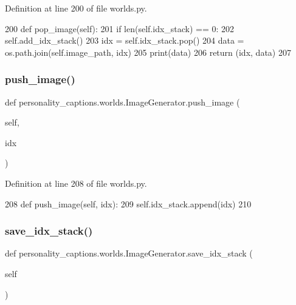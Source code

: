 Definition at line 200 of file worlds.\+py.


\begin{DoxyCode}
200     \textcolor{keyword}{def }pop\_image(self):
201         \textcolor{keywordflow}{if} len(self.idx\_stack) == 0:
202             self.add\_idx\_stack()
203         idx = self.idx\_stack.pop()
204         data = os.path.join(self.image\_path, idx)
205         print(data)
206         \textcolor{keywordflow}{return} (idx, data)
207 
\end{DoxyCode}
\mbox{\label{classpersonality__captions_1_1worlds_1_1ImageGenerator_a78705bbcfdb530dc94ff25cc0aa7fd65}} 
\subsubsection{\texorpdfstring{push\+\_\+image()}{push\_image()}}
{\footnotesize\ttfamily def personality\+\_\+captions.\+worlds.\+Image\+Generator.\+push\+\_\+image (\begin{DoxyParamCaption}\item[{}]{self,  }\item[{}]{idx }\end{DoxyParamCaption})}



Definition at line 208 of file worlds.\+py.


\begin{DoxyCode}
208     \textcolor{keyword}{def }push\_image(self, idx):
209         self.idx\_stack.append(idx)
210 
\end{DoxyCode}
\mbox{\label{classpersonality__captions_1_1worlds_1_1ImageGenerator_a1a62516fa0aad79a400d8824f7353d42}} 
\subsubsection{\texorpdfstring{save\+\_\+idx\+\_\+stack()}{save\_idx\_stack()}}
{\footnotesize\ttfamily def personality\+\_\+captions.\+worlds.\+Image\+Generator.\+save\+\_\+idx\+\_\+stack (\begin{DoxyParamCaption}\item[{}]{self }\end{DoxyParamCaption})}



